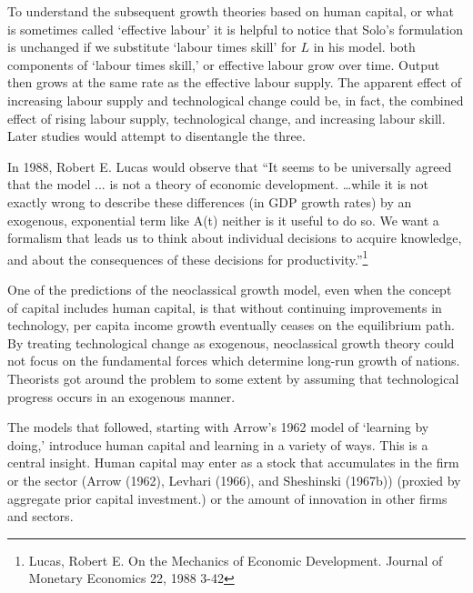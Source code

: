 To understand the subsequent growth theories based on human capital, or what is sometimes called `effective labour' it is helpful to notice that Solo's formulation is unchanged if we substitute `labour times  skill' for $L$ in his model. both components of `labour times  skill,' or effective labour grow over time. Output then grows at the same rate as the effective labour supply. The apparent effect of increasing labour supply and technological change could be, in fact, the combined effect of rising labour supply, technological change, and increasing labour skill. Later studies would attempt to disentangle the three.


In 1988, Robert E. Lucas would observe that ``It seems to be universally agreed that the model ... is not a theory of economic development.   \dots while it is not exactly wrong to describe these differences (in GDP  growth rates) by an exogenous, exponential term like A(t) neither is it useful to do so. We want a formalism that leads us to think about individual decisions to acquire knowledge, and about the consequences of these decisions for productivity.''\footnote{Lucas,  Robert E. On the Mechanics of Economic Development. Journal of Monetary Economics 22, 1988 3-42} 


One of the predictions of the neoclassical growth model, even  when the concept of capital includes human capital, is that without  continuing improvements in technology, per capita income growth eventually ceases on the equilibrium path. 
By treating technological change as exogenous, neoclassical growth theory could not focus on the fundamental forces which determine long-run growth of nations. Theorists got around the problem to some extent by assuming that technological progress occurs in an exogenous manner. 

The models that followed, starting with Arrow's 1962 model of `learning by doing,' introduce human capital and learning in a variety of ways. This is a central insight. Human capital may enter  as a stock that accumulates in the firm or the sector (Arrow (1962), Levhari (1966), and Sheshinski (1967b)) (proxied by aggregate prior capital investment.)
or the amount of innovation in other firms and sectors. %

